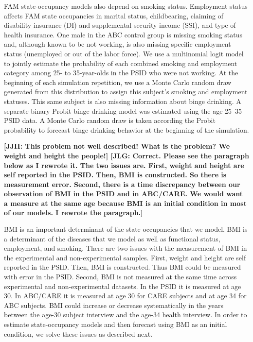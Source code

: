 \noindent FAM state-occupancy models also depend on smoking status. Employment status affects FAM state occupancies in marital status, childbearing, claiming of disability insurance (DI) and supplemental security income (SSI), and type of health insurance.
One male in the ABC control group is missing smoking status and, although known to be not working, is also missing specific employment status (unemployed or out of the labor force).
 We use a multinomial logit model to jointly estimate the probability of each combined smoking and employment category among 25- to 35-year-olds in the PSID who were not working. At the beginning of each simulation repetition, we use a Monte Carlo random draw generated from this distribution to assign this subject's smoking and employment statuses. This same subject is also missing information about binge drinking. A separate binary Probit binge drinking model was estimated using the age 25--35 PSID data. A Monte Carlo random draw is taken according the Probit probability to forecast binge drinking behavior at the beginning of the simulation.

\noindent \textbf{[JJH: This problem not well described! What is the problem? We weight and height the people!] [JLG: Correct. Please see the paragraph below as I rewrote it. The two issues are. First, weight and height are self reported in the PSID. Then, BMI is constructed. So there is measurement error. Second, there is a time discrepancy between our observation of BMI in the PSID and in ABC/CARE. We would want a measure at the same age because BMI is an initial condition in most of our models. I rewrote the paragraph.]}

\noindent BMI is an important determinant of the state occupancies that we model. BMI is a determinant of the diseases that we model as well as functional status, employment, and smoking. There are two issues with the measurement of BMI in the experimental and non-experimental samples. First, weight and height are self reported in the PSID. Then, BMI is constructed. Thus BMI could be measured with error in the PSID. Second, BMI is not measured at the same time across experimental and non-experimental datasets. In the PSID it is measured at age 30. In ABC/CARE it is measured at age 30 for CARE subjects and at age 34 for ABC subjects. BMI could increase or decrease systematically in the years between the age-30 subject interview and the age-34 health interview. In order to estimate state-occupancy models and then forecast using BMI as an initial condition, we solve these issues as described next.

